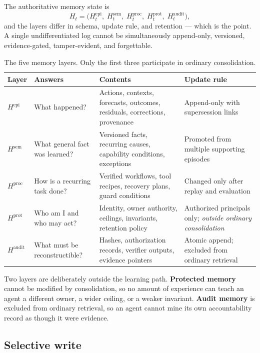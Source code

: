 \documentclass[11pt]{article}
\begin{document}
The authoritative memory state is
\begin{equation}
H_t=\big(H^{\mathrm{epi}}_t,\;H^{\mathrm{sem}}_t,\;H^{\mathrm{proc}}_t,\;H^{\mathrm{prot}}_t,\;H^{\mathrm{audit}}_t\big),
\label{eq:memstate}
\end{equation}
and the layers differ in schema, update rule, and retention --- which is the point. A single undifferentiated log cannot be simultaneously append-only, versioned, evidence-gated, tamper-evident, and forgettable.

\begin{table}[h]
\centering\small
\caption{The five memory layers. Only the first three participate in ordinary consolidation.}
\label{tab:memlayers}
\begin{tabular}{@{}lL{3.5cm}L{4.2cm}L{4.0cm}@{}}
\toprule
\textbf{Layer} & \textbf{Answers} & \textbf{Contents} & \textbf{Update rule} \\
\midrule
$H^{\mathrm{epi}}$ & What happened? & Actions, contexts, forecasts, outcomes, residuals, corrections, provenance & Append-only with supersession links \\
$H^{\mathrm{sem}}$ & What general fact was learned? & Versioned facts, recurring causes, capability conditions, exceptions & Promoted from multiple supporting episodes \\
$H^{\mathrm{proc}}$ & How is a recurring task done? & Verified workflows, tool recipes, recovery plans, guard conditions & Changed only after replay and evaluation \\
$H^{\mathrm{prot}}$ & Who am I and who may act? & Identity, owner authority, ceilings, invariants, retention policy & Authorized principals only; \emph{outside ordinary consolidation} \\
$H^{\mathrm{audit}}$ & What must be reconstructible? & Hashes, authorization records, verifier outputs, evidence pointers & Atomic append; excluded from ordinary retrieval \\
\bottomrule
\end{tabular}
\end{table}

Two layers are deliberately outside the learning path. \textbf{Protected memory} cannot be modified by consolidation, so no amount of experience can teach an agent a different owner, a wider ceiling, or a weaker invariant. \textbf{Audit memory} is excluded from ordinary retrieval, so an agent cannot mine its own accountability record as though it were evidence.

\subsection{Selective write}
\end{document}
